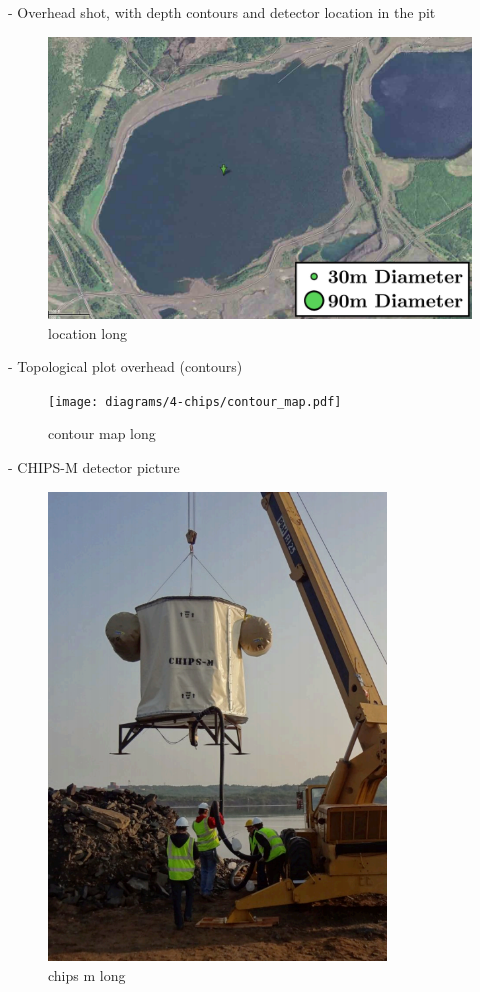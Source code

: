 - Overhead shot, with depth contours and detector location in the pit
\begin{figure}
    \includegraphics[width=\textwidth]{diagrams/4-chips/location.png}
    \caption[location short]{location long}
    \label{fig:location}
\end{figure}
- Topological plot overhead (contours)
\begin{figure}
    \texttt{[image: diagrams/4-chips/contour\_map.pdf]}
    \caption[contour map short]{contour map long}
    \label{fig:contour_map}
\end{figure}
- CHIPS-M detector picture
\begin{figure}
    \includegraphics[width=0.8\textwidth]{diagrams/4-chips/chips_m.png}
    \caption[chips m short]{chips m long}
    \label{fig:chips_m}
\end{figure}
